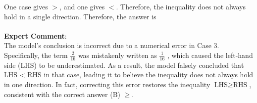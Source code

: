 \begin{examplebox}
One case gives $>$, and one gives $<$. Therefore, the inequality does not always hold in a single direction. Therefore, the answer is 
\\\\
\textbf{Expert Comment}: \\
The model’s conclusion is incorrect due to a numerical error in Case 3. Specifically, the term $\frac{2}{16}$ was mistakenly written as $\frac{1}{16}$ \wronghl, which caused the left-hand side (LHS) to be underestimated. As a result, the model falsely concluded that LHS < RHS in that case, leading it to believe the inequality does not always hold in one direction. In fact, correcting this error restores the inequality $\text{LHS} \geq \text{RHS}$, consistent with the correct answer (B) $\geq$.

\end{examplebox}
